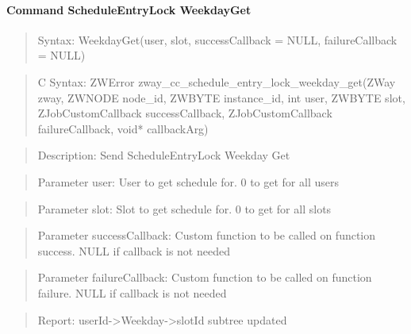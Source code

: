 \paragraph{Command ScheduleEntryLock WeekdayGet}
\begin{quote}Syntax: WeekdayGet(user, slot, successCallback = NULL, failureCallback = NULL)\end{quote}
\begin{quote}C Syntax: ZWError zway\_cc\_schedule\_entry\_lock\_weekday\_get(ZWay zway, ZWNODE node\_id, ZWBYTE instance\_id, int user, ZWBYTE slot, ZJobCustomCallback successCallback, ZJobCustomCallback failureCallback, void* callbackArg)\end{quote}
\begin{quote}Description: Send ScheduleEntryLock Weekday Get\end{quote}
\begin{quote}Parameter user: User to get schedule for. 0 to get for all users\end{quote}
\begin{quote}Parameter slot: Slot to get schedule for. 0 to get for all slots\end{quote}
\begin{quote}Parameter successCallback: Custom function to be called on function success. NULL if callback is not needed\end{quote}
\begin{quote}Parameter failureCallback: Custom function to be called on function failure. NULL if callback is not needed\end{quote}
\begin{quote}Report: userId->Weekday->slotId subtree updated\end{quote}

